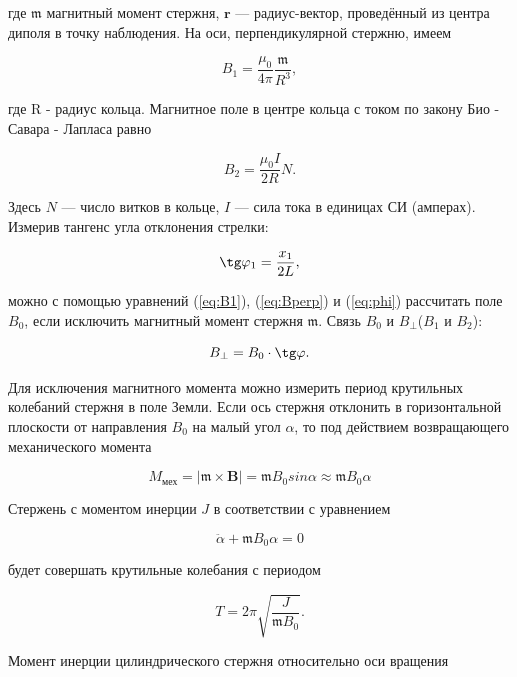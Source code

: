 \documentclass[12pt,a4paper]{article}
\begin{document}
где $\mathfrak{m}$ магнитный момент стержня, $\textbf{r}$ — радиус-вектор, проведённый из центра диполя в точку наблюдения. На оси, перпендикулярной стержню, имеем

\begin{equation}
    B_1 = \frac{\mu_0}{4\pi}\frac{\mathfrak{m}}{R^3},
    \label{eq:B1}
\end{equation}

где R - радиус кольца.
Магнитное поле в центре кольца с током по закону Био - Савара - Лапласа равно

\begin{equation}
    B_2 = \frac{\mu_0 I}{2R}N.
    \label{eq:B2}
\end{equation}

Здесь $N$ — число витков в кольце, $I$ — сила тока в единицах СИ (амперах).
Измерив тангенс угла отклонения стрелки:

\begin{equation}
    \tg \varphi_1 = \frac{x_1}{2L},
    \label{eq:phi}
\end{equation}

можно с помощью уравнений (\ref{eq:B1}), (\ref{eq:Bperp}) и (\ref{eq:phi}) рассчитать поле $B_0$, если исключить магнитный момент стержня $\mathfrak{m}$.
Связь $B_0$ и $B_\perp$($B_1$ и $B_2$):

\begin{equation}
    B_\perp = B_0 \cdot \tg \varphi.
    \label{eq:Bperp}
\end{equation}

Для исключения магнитного момента можно измерить период крутильных колебаний стержня в поле Земли. Если ось стержня отклонить в горизонтальной плоскости от
направления $B_0$ на малый угол $\alpha$, то под действием возвращающего механического момента

$$ M_\text{мех}=|\mathfrak{m}\times \textbf{B}|=\mathfrak{m} B_0 sin \alpha \approx \mathfrak{m} B_0 \alpha $$
    
Стержень с моментом инерции $J$ в соответствии с уравнением

$$\ddot{\alpha}+\mathfrak{m} B_0 \alpha = 0$$

будет совершать крутильные колебания с периодом

\begin{equation}
    T = 2\pi \sqrt{\frac{J}{\mathfrak{m} B_0}}.
    \label{eq:t}
\end{equation}

Момент инерции цилиндрического стержня относительно оси вращения
\end{document}
